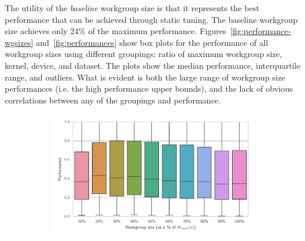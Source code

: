 \documentclass[nonatbib,preprint,nocopyrightspace,9pt]{sigplanconf}
\begin{document}
The utility of the \emph{baseline} workgroup size is that it
represents the best performance that can be achieved through static
tuning. The baseline workgroup size achieves only 24\% of the maximum
performance. Figures~\ref{fig:performance-wgsizes}
and~\ref{fig:performances} show box plots for the performance of all
workgroup sizes using different groupings: ratio of maximum workgroup
size, kernel, device, and dataset. The plots show the median
performance, interquartile range, and outliers. What is evident is
both the large range of workgroup size performances (i.e. the high
performance upper bounds), and the lack of obvious correlations
between any of the groupings and performance.


\begin{figure}
  \begin{subfigure}[h]{\columnwidth}
    \centering
    \includegraphics[width=\columnwidth]{img/performance_max_wgsize}
    \vspace{-1.5em} %
    \caption{}
    \label{fig:performance-max-wgsize}
  \end{subfigure}
  \\
  \begin{subfigure}[h]{.48\columnwidth}
    \centering

\end{subfigure}
\end{figure}
\end{document}

